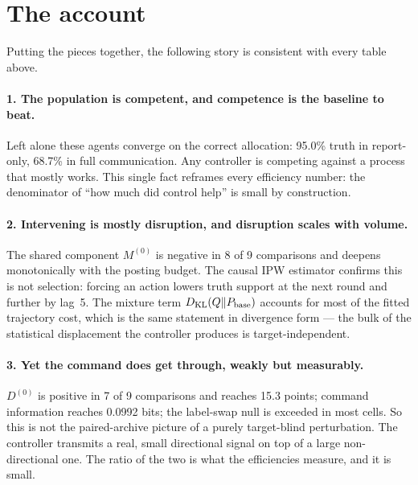 \documentclass[11pt]{article}
\newcommand{\DKL}{D_{\mathrm{KL}}}
\begin{document}
\section{The account}\label{sec:story}
Putting the pieces together, the following story is consistent with every table above.

\paragraph{1. The population is competent, and competence is the baseline to beat.}
Left alone these agents converge on the correct allocation: 95.0\% truth in
report-only, 68.7\% in full communication. Any controller is competing against a
process that mostly works. This single fact reframes every efficiency number: the
denominator of ``how much did control help'' is small by construction.

\paragraph{2. Intervening is mostly disruption, and disruption scales with volume.}
The shared component $M^{(0)}$ is negative in 8 of 9 comparisons and
deepens monotonically with the posting budget. The causal IPW estimator confirms this is
not selection: forcing an action lowers truth support at the next round and further by lag~5.
The mixture term $\DKL(Q\Vert P_{\rm base})$ accounts for most of the fitted trajectory cost,
which is the same statement in divergence form --- the bulk of the statistical displacement
the controller produces is target-independent.

\paragraph{3. Yet the command does get through, weakly but measurably.}
$D^{(0)}$ is positive in 7 of 9 comparisons and reaches 15.3
points; command information reaches 0.0992 bits; the label-swap null is exceeded in
most cells. So this is not the paired-archive picture of a purely target-blind perturbation.
The controller transmits a real, small directional signal on top of a large non-directional
one. The ratio of the two is what the efficiencies measure, and it is small.
\end{document}
